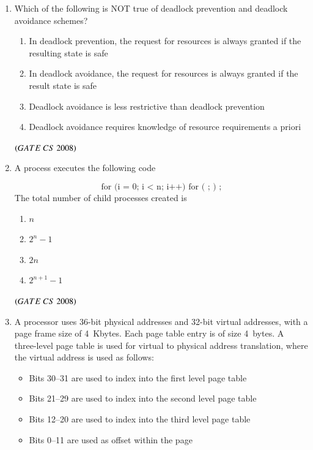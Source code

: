 \documentclass[journal, onecolumn]{IEEEtran}
\numberwithin{equation}{enumi}
\numberwithin{figure}{enumi}
\begin{document}
\begin{enumerate}
\item Which of the following is NOT true of deadlock prevention and deadlock
avoidance schemes? 
\begin{enumerate}
   \item  In deadlock prevention, the request for resources is always granted if the resulting state is safe
   \item In deadlock avoidance, the request for resources is always granted if the result state is safe
   \item Deadlock avoidance is less restrictive than deadlock prevention
   \item  Deadlock avoidance requires knowledge of resource requirements a priori 
 \bigskip
 \end{enumerate}
\hfill $\left(GATE\ CS\  2008\right)$

\item A process executes the following code

\[
\text{for (i = 0; i < n; i++) for ( ; ) ;}
\]
The total number of child processes created is
\vspace{-1em}%
\begin{multicols}{4}
\begin{enumerate}
   \item  $n$
   \item  $2^{n} - 1$
   \item  $2n$
   \item  $2^{n+1} - 1$
\end{enumerate}
\end{multicols}
\hfill $\left(GATE\ CS\  2008\right)$

\item A processor uses 36-bit physical addresses and 32-bit virtual addresses, with a page frame size of 4~Kbytes.  
Each page table entry is of size 4~bytes.  
A three-level page table is used for virtual to physical address translation, where the virtual address is used as follows:

\begin{itemize}
    \item Bits 30--31 are used to index into the first level page table
    \item Bits 21--29 are used to index into the second level page table
    \item Bits 12--20 are used to index into the third level page table
    \item Bits 0--11 are used as offset within the page
\end{itemize}


\end{enumerate}
\end{document}
